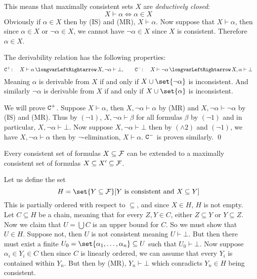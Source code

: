 This means that maximally consistent sets $X$ are {\it deductively closed}:
$$ X\vdash\alpha \iff \alpha\in X $$
Obviously if $\alpha\in X$ then by (IS) and (MR), $X\vdash\alpha$.
Now suppose that $X\vdash\alpha$, then since $\alpha\in X$ or $\neg\alpha\in X$, we cannot have $\neg\alpha\in X$ since $X$ is consistent.
Therefore $\alpha\in X$.

\blemm

    The derivability relation has the following properties:
    $$ {\tt C}^+\colon\quad X\vdash\alpha\iff X,\neg\alpha\vdash\bot,\qquad {\tt C}^-\colon\quad X\vdash\neg\alpha\iff X,\alpha\vdash\bot $$
    Meaning $\alpha$ is derivable from $X$ if and only if $X\cup\set{\neg\alpha}$ is inconsistent.
    And similarly $\neg\alpha$ is derivable from $X$ if and only if $X\cup\set{\alpha}$ is inconsistent.

\elemm

We will prove ${\tt C}^+$.
Suppose $X\vdash\alpha$, then $X,\neg\alpha\vdash\alpha$ by (MR) and $X,\neg\alpha\vdash\neg\alpha$ by (IS) and (MR).
Thus by $(\neg1)$, $X,\neg\alpha\vdash\beta$ for all formulas $\beta$ by $(\neg1)$ and in particular, $X,\neg\alpha\vdash\bot$.
Now suppose $X,\neg\alpha\vdash\bot$ then by $(\land2)$ and $(\neg1)$, we have $X,\neg\alpha\vdash\alpha$ then by $\neg$-elimination, $X\vdash\alpha$.
${\tt C}^-$ is proven similarly.
\qed

\blemm[title=Lindenbaum's Theorem, name=lindenbaum]

    Every consistent set of formulas $X\subseteq{\cal F}$ can be extended to a maximally consistent set of formulas $X\subseteq X'\subseteq{\cal F}$.

\elemm

Let us define the set
$$ H = \set{Y\subseteq{\cal F}}[\hbox{$Y$ is consistent and $X\subseteq Y$}] $$
This is partially ordered with respect to $\subseteq$, and since $X\in H$, $H$ is not empty.
Let $C\subseteq H$ be a chain, meaning that for every $Z,Y\in C$, either $Z\subseteq Y$ or $Y\subseteq Z$.
Now we claim that $U=\bigcup C$ is an upper bound for $C$.
So we must show that $U\in H$.
Suppose not, then $U$ is not consistent meaning $U\vdash\bot$.
But then there must exist a finite $U_0=\set{\alpha_1,\dots,\alpha_n}\subseteq U$ such that $U_0\vdash\bot$.
Now suppose $\alpha_i\in Y_i\in C$ then since $C$ is linearly ordered, we can assume that every $Y_i$ is contained within $Y_n$.
But then by (MR), $Y_n\vdash\bot$ which conradicts $Y_n\in H$ being consistent.


